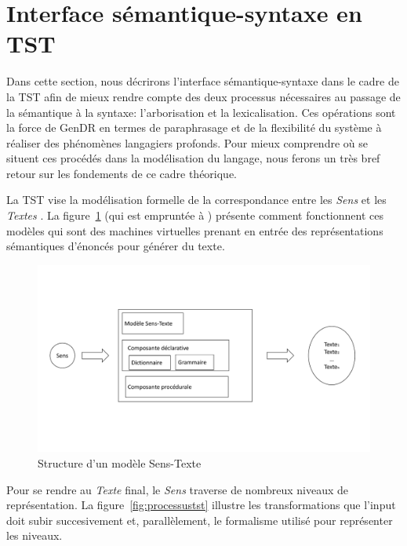 \section{Interface sémantique-syntaxe en TST}\label{sec:semsynt}

Dans cette section, nous décrirons l'interface sémantique-syntaxe dans le cadre de la \ac{TST} afin de mieux rendre compte des deux processus nécessaires au passage de la sémantique à la syntaxe: l'arborisation et la lexicalisation. Ces opérations sont la force de GenDR en termes de paraphrasage et de la flexibilité du système à réaliser des phénomènes langagiers profonds. Pour mieux comprendre où se situent ces procédés dans la modélisation du langage, nous ferons un très bref retour sur les fondements de ce cadre théorique.

La \ac{TST} vise la modélisation formelle de la correspondance entre les \emph{Sens} et les \emph{Textes} \citep{DBLP:conf/coling/JolkovskyM67, MelcukVerslinguistiqueSensTexte1997, PolgueretheorieSensTexte1998}. La figure~\ref{fig:modeletst} (qui est empruntée à \cite{PolgueretheorieSensTexte1998}) présente comment fonctionnent ces modèles qui sont des machines virtuelles prenant en entrée des représentations sémantiques d'énoncés pour générer du texte.

\begin{figure}[htb]
	\centering
	\includegraphics[width=1\textwidth, trim = {0cm 4cm 0cm 4cm},clip]{ch3/figs/polguere1.pdf}
	\caption{Structure d'un modèle Sens-Texte \citep{PolgueretheorieSensTexte1998}}
	\label{fig:modeletst}
\end{figure}

Pour se rendre au \emph{Texte} final, le \emph{Sens} traverse de nombreux niveaux de représentation. La figure~\ref{fig:processustst} illustre les transformations que l'input doit subir succesivement et, parallèlement, le formalisme utilisé pour représenter les niveaux.

